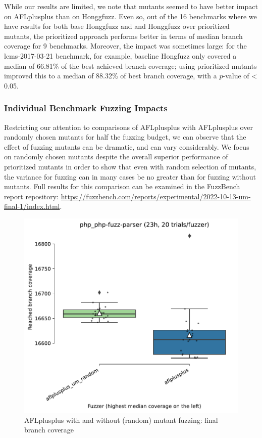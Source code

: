     While our results are limited, we note that mutants seemed to have better impact on AFLplusplus than on Honggfuzz.  Even so, out of  the 16 benchmarks where we have results for both base Honggfuzz and and Honggfuzz over prioritized mutants, the prioritized approach performs better in terms of median branch coverage for 9 benchmarks.  Moreover, the impact was sometimes large:  for the lcms-2017-03-21 benchmark, for example, baseline Hongfuzz only covered a median of 66.81\% of the best achieved branch coverage; using prioritized mutants improved this to a median of 88.32\% of best branch coverage, with a $p$-value of < 0.05.

\subsubsection{Individual Benchmark Fuzzing Impacts}
    
Restricting our attention to comparisons of AFLplusplus with AFLplusplus over randomly chosen mutants for half the fuzzing budget, we can observe that the effect of fuzzing mutants can be dramatic, and can vary considerably.  We focus on randomly chosen mutants despite the overall superior performance of prioritized mutants in order to show that even with random selection of mutants, the variance for fuzzing can in many cases be no greater than for fuzzing without mutants.  Full results for this comparison can be examined in the FuzzBench report repository: \url{https://fuzzbench.com/reports/experimental/2022-10-13-um-final-1/index.html}.

\begin{figure}
  \includegraphics[width=0.75\columnwidth]{php_php-fuzz-parser_boxplot.pdf}
  \caption{AFLplusplus with and without (random) mutant fuzzing: final branch coverage}
  \label{fig:phpbox}
  
\end{figure}

